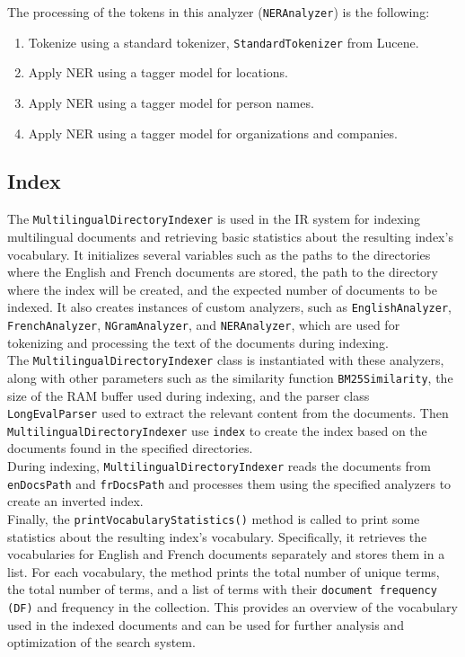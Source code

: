 The processing of the tokens in this analyzer (\texttt{NERAnalyzer}) is the following:
\begin{enumerate}
    \item Tokenize using a standard tokenizer, \texttt{StandardTokenizer} from Lucene.
    \item Apply NER using a tagger model for locations.
    \item Apply NER using a tagger model for person names.
    \item Apply NER using a tagger model for organizations and companies.
\end{enumerate}

\subsection{Index}\label{subsec:index}
The \texttt{MultilingualDirectoryIndexer} is used in the IR system for indexing multilingual
documents and retrieving basic statistics about the resulting index's vocabulary.
It initializes several variables such as the paths to the directories where
the English and French documents are stored, the path to the directory where
the index will be created, and the expected number of documents to be indexed.
It also creates instances of custom analyzers, such as \texttt{EnglishAnalyzer},
\texttt{FrenchAnalyzer}, \texttt{NGramAnalyzer}, and \texttt{NERAnalyzer}, which are used for tokenizing
and processing the text of the documents during indexing.\\

The  \texttt{MultilingualDirectoryIndexer}  class is instantiated with these
analyzers, along with other parameters such as the similarity function
\texttt{BM25Similarity}, the size of the RAM buffer used during indexing,
and the parser class \texttt{LongEvalParser} used to extract the relevant
content from the documents. Then \texttt{MultilingualDirectoryIndexer} use \texttt{index} to create the index based on the documents found in the
specified directories.\\

During indexing, \texttt{MultilingualDirectoryIndexer} reads the documents from
\texttt{enDocsPath} and \texttt{frDocsPath} and processes them using the specified analyzers
to create an inverted index.\\

Finally, the \texttt{printVocabularyStatistics()} method is called to print some
statistics about the resulting index's vocabulary. Specifically, it retrieves
the vocabularies for English and French documents separately and stores them
in a list. For each vocabulary, the method prints the total number of unique
terms, the total number of terms, and a list of terms with their \texttt{document
frequency (DF)} and frequency in the collection. This provides an overview of
the vocabulary used in the indexed documents and can be used for further
analysis and optimization of the search system.\\

